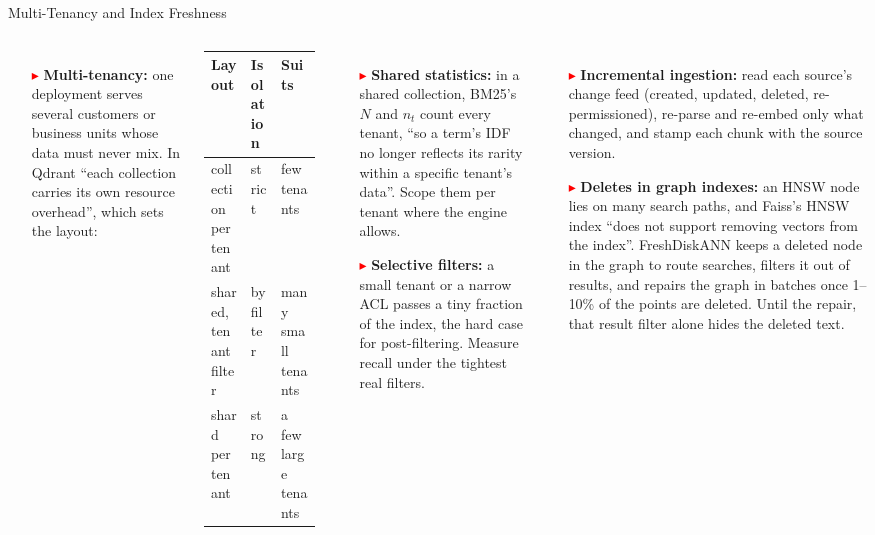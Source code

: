 \begin{frame}{Multi-Tenancy and Index Freshness}
  \begin{columns}[T,onlytextwidth]
      \begin{itemize}\scriptsize
        \item[\textcolor{red}{$\blacktriangleright$}] \textbf{Multi-tenancy:} one deployment serves several customers or business units whose data must never mix. In Qdrant ``each collection carries its own resource overhead'', which sets the layout:
      \end{itemize}
      \vspace{0.2em}
      {\centering\scriptsize\setlength{\tabcolsep}{4pt}
      \begin{tabular}{lll}
        \toprule
        \textbf{Layout} & \textbf{Isolation} & \textbf{Suits} \\
        \midrule
        collection per tenant & strict & few tenants \\
        shared, tenant filter & by filter & many small tenants \\
        shard per tenant & strong & a few large tenants \\
        \bottomrule
      \end{tabular}\par}
      \vspace{0.3em}
      \begin{itemize}\scriptsize\itemsep0.4em
        \item[\textcolor{red}{$\blacktriangleright$}] \textbf{Shared statistics:} in a shared collection, BM25's $N$ and $n_t$ count every tenant, ``so a term's IDF no longer reflects its rarity within a specific tenant's data''. Scope them per tenant where the engine allows.
        \item[\textcolor{red}{$\blacktriangleright$}] \textbf{Selective filters:} a small tenant or a narrow ACL passes a tiny fraction of the index, the hard case for post-filtering. Measure recall under the tightest real filters.
      \end{itemize}
      \begin{itemize}\scriptsize\itemsep0.4em
        \item[\textcolor{red}{$\blacktriangleright$}] \textbf{Incremental ingestion:} read each source's change feed (created, updated, deleted, re-permissioned), re-parse and re-embed only what changed, and stamp each chunk with the source version.
        \item[\textcolor{red}{$\blacktriangleright$}] \textbf{Deletes in graph indexes:} an HNSW node lies on many search paths, and Faiss's HNSW index ``does not support removing vectors from the index''. FreshDiskANN keeps a deleted node in the graph to route searches, filters it out of results, and repairs the graph in batches once 1--10\% of the points are deleted. Until the repair, that result filter alone hides the deleted text.

\end{itemize}
\end{columns}
\end{frame}
